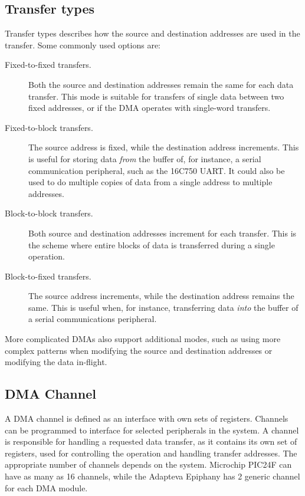 \subsection{Transfer types}
Transfer types \cite{microchip54} describes how the source and destination addresses are used in the transfer.
Some commonly used options are:
\begin{description}
    \item[Fixed-to-fixed transfers.]
    Both the source and destination addresses remain the same for each data transfer.
    This mode is suitable for transfers of single data between two fixed addresses,
    or if the DMA operates with single-word transfers.
    \item[Fixed-to-block transfers.]
    The source address is fixed, while the destination address increments.
    This is useful for storing data \emph{from} the buffer of, for instance, a serial
    communication peripheral, such as the 16C750 UART.
    It could also be used to do multiple copies of data from a single address to multiple addresses.
    \item[Block-to-block transfers.]
    Both source and destination addresses increment for each transfer.
    This is the scheme where entire blocks of data is transferred during a single operation.
    \item[Block-to-fixed transfers.]
    The source address increments, while the destination address remains the same.
    This is useful when, for instance, transferring data \emph{into} the buffer of a
    serial communications peripheral.
\end{description}

More complicated DMAs also support  additional modes, such as using more complex patterns
when modifying the source and destination addresses or modifying the data in-flight.

\subsection{DMA Channel}
A DMA channel is defined \cite[p.~422]{DMAOxford} as an interface with own sets of registers.
Channels can be programmed to interface for selected peripherals in the system.
A channel is responsible for handling a requested data transfer, as it contains its own set of registers, used for controlling the operation and handling transfer addresses.
The  appropriate number of channels depends on the system.
Microchip PIC24F \cite{microchip54} can have as many as 16 channels, while the Adapteva Epiphany \cite{epiphany} has 2 generic channel for each DMA module.

